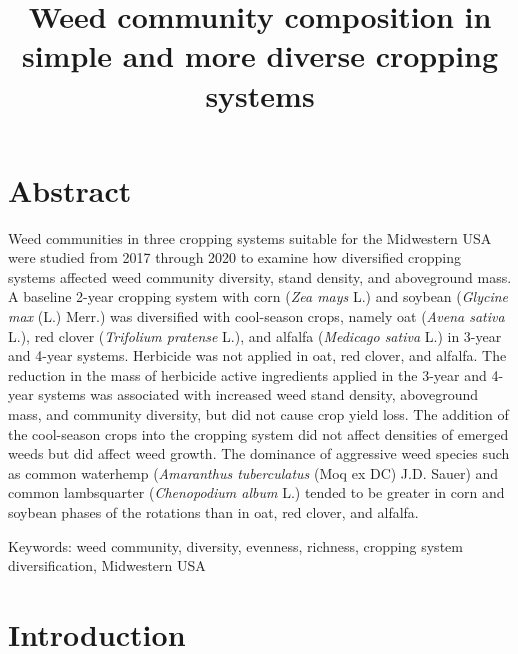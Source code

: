 \documentclass[
]{article}
\title{Weed community composition in simple and more diverse cropping systems}
\author{}
\date{\vspace{-2.5em}}
\begin{document}
\maketitle

\hypertarget{abstract}{%
\section*{Abstract}\label{abstract}}

Weed communities in three cropping systems suitable for the Midwestern USA were studied from 2017 through 2020 to examine how diversified cropping systems affected weed community diversity, stand density, and aboveground mass. A baseline 2-year cropping system with corn (\emph{Zea mays} L.) and soybean (\emph{Glycine max} (L.) Merr.) was diversified with cool-season crops, namely oat (\emph{Avena sativa} L.), red clover (\emph{Trifolium pratense} L.), and alfalfa (\emph{Medicago sativa} L.) in 3-year and 4-year systems. Herbicide was not applied in oat, red clover, and alfalfa. The reduction in the mass of herbicide active ingredients applied in the 3-year and 4-year systems was associated with increased weed stand density, aboveground mass, and community diversity, but did not cause crop yield loss. The addition of the cool-season crops into the cropping system did not affect densities of emerged weeds but did affect weed growth. The dominance of aggressive weed species such as common waterhemp (\emph{Amaranthus tuberculatus} (Moq ex DC) J.D. Sauer) and common lambsquarter (\emph{Chenopodium album} L.) tended to be greater in corn and soybean phases of the rotations than in oat, red clover, and alfalfa.

Keywords: weed community, diversity, evenness, richness, cropping system diversification, Midwestern USA

\hypertarget{introduction}{%
\section*{Introduction}\label{introduction}}
\end{document}
